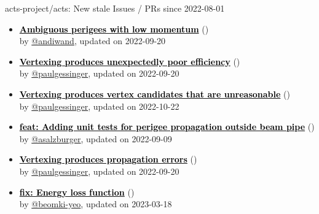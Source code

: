 \begin{frame}[allowframebreaks]{ acts-project/acts: New stale Issues / PRs since 2022-08-01 }
\begin{itemize}
    \item\iss\prstale\textbf{\href{https://github.com/acts-project/acts/issues/1386}{\textcolor{black}{Ambiguous perigees with low momentum}}}
    (\href{https://github.com/acts-project/acts/issues/1386}{}) \\
    by \href{https://github.com/andiwand}{@andiwand}, updated on 2022-09-20

    \item\iss\prstale\textbf{\href{https://github.com/acts-project/acts/issues/1362}{\textcolor{black}{Vertexing produces unexpectedly poor efficiency}}}
    (\href{https://github.com/acts-project/acts/issues/1362}{}) \\
    by \href{https://github.com/paulgessinger}{@paulgessinger}, updated on 2022-09-20

    \item\iss\prstale\textbf{\href{https://github.com/acts-project/acts/issues/1361}{\textcolor{black}{Vertexing produces vertex candidates that are unreasonable}}}
    (\href{https://github.com/acts-project/acts/issues/1361}{}) \\
    by \href{https://github.com/paulgessinger}{@paulgessinger}, updated on 2022-10-22

    \item\propen\prwip\prstale\textbf{\href{https://github.com/acts-project/acts/pull/1354}{\textcolor{black}{feat: Adding unit tests for perigee propagation outside beam pipe}}}
    (\href{https://github.com/acts-project/acts/pull/1354}{}) \\
    by \href{https://github.com/asalzburger}{@asalzburger}, updated on 2022-09-09

    \item\iss\prstale\textbf{\href{https://github.com/acts-project/acts/issues/1345}{\textcolor{black}{Vertexing produces propagation errors}}}
    (\href{https://github.com/acts-project/acts/issues/1345}{}) \\
    by \href{https://github.com/paulgessinger}{@paulgessinger}, updated on 2022-09-20

    \item\propen\prstale\textbf{\href{https://github.com/acts-project/acts/pull/1323}{\textcolor{black}{fix: Energy loss function}}}
    (\href{https://github.com/acts-project/acts/pull/1323}{}) \\
    by \href{https://github.com/beomki-yeo}{@beomki-yeo}, updated on 2023-03-18


\end{itemize}
\end{frame}
